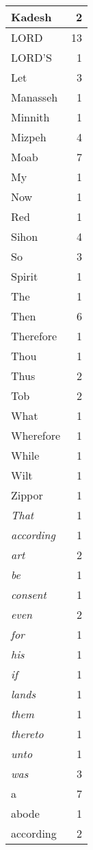 \begin{center}
\begin{longtable}{l|r}
Kadesh & 2\\ \hline 
LORD & 13\\ \hline 
LORD'S & 1\\ \hline 
Let & 3\\ \hline 
Manasseh & 1\\ \hline 
Minnith & 1\\ \hline 
Mizpeh & 4\\ \hline 
Moab & 7\\ \hline 
My & 1\\ \hline 
Now & 1\\ \hline 
Red & 1\\ \hline 
Sihon & 4\\ \hline 
So & 3\\ \hline 
Spirit & 1\\ \hline 
The & 1\\ \hline 
Then & 6\\ \hline 
Therefore & 1\\ \hline 
Thou & 1\\ \hline 
Thus & 2\\ \hline 
Tob & 2\\ \hline 
What & 1\\ \hline 
Wherefore & 1\\ \hline 
While & 1\\ \hline 
Wilt & 1\\ \hline 
Zippor & 1\\ \hline 
\emph{That} & 1\\ \hline 
\emph{according} & 1\\ \hline 
\emph{art} & 2\\ \hline 
\emph{be} & 1\\ \hline 
\emph{consent} & 1\\ \hline 
\emph{even} & 2\\ \hline 
\emph{for} & 1\\ \hline 
\emph{his} & 1\\ \hline 
\emph{if} & 1\\ \hline 
\emph{lands} & 1\\ \hline 
\emph{them} & 1\\ \hline 
\emph{thereto} & 1\\ \hline 
\emph{unto} & 1\\ \hline 
\emph{was} & 3\\ \hline 
a & 7\\ \hline 
abode & 1\\ \hline 
according & 2\\ \hline 

\end{longtable}
\end{center}
